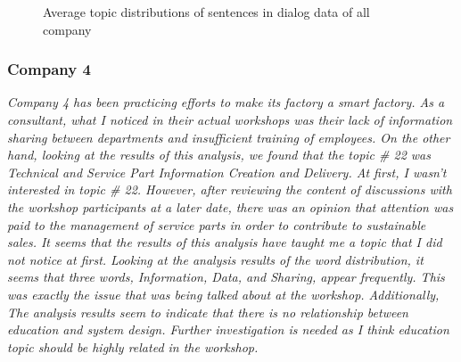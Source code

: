 \documentclass[10pt, conference, compsocconf]{IEEEtran}
\begin{document}
\begin{figure}[t]
\caption{Average topic distributions of sentences in dialog data of all company}
\label{fig_c}
\end{figure}

\subsubsection{Company 4}
{\it Company 4 has been practicing efforts to make its factory a smart factory. As a consultant, what I noticed in their actual workshops was their lack of information sharing between departments and insufficient training of employees. On the other hand, looking at the results of this analysis, we found that the topic \# 22 was Technical and Service Part Information Creation and Delivery. At first, I wasn't interested in topic \# 22. However, after reviewing the content of discussions with the workshop participants at a later date, there was an opinion that attention was paid to the management of service parts in order to contribute to sustainable sales. It seems that the results of this analysis have taught me a topic that I did not notice at first. Looking at the analysis results of the word distribution, it seems that three words, Information, Data, and Sharing, appear frequently. This was exactly the issue that was being talked about at the workshop. Additionally, The analysis results seem to indicate that there is no relationship between education and system design. Further investigation is needed as I think education topic should be highly related in the workshop.}
\medskip
\end{document}
